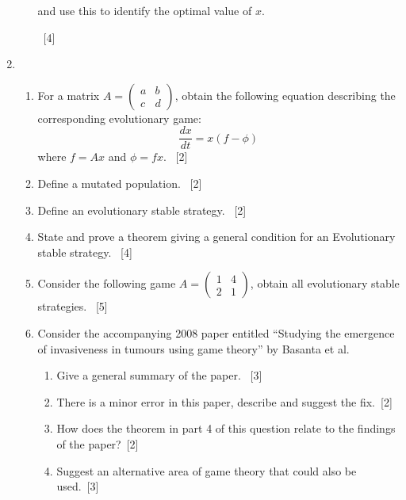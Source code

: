 \documentclass[12pt,a4paper]{article}
\begin{document}
\begin{enumerate}
\begin{enumerate}
            and use this to identify the optimal value of \(x\).

            ~\hfill{[4]}
    \end{enumerate}

\newpage
\item

    \begin{enumerate}
        \item For a matrix \(A=\begin{pmatrix}a&b\\c &d\end{pmatrix}\), obtain
              the following equation describing the corresponding evolutionary
              game:
              \[\frac{dx}{dt}=x(f-\phi)\]
              where \(f=Ax\) and \(\phi=fx\).
              ~\hfill{[2]}
        \item Define a mutated population.
              ~\hfill{[2]}
        \item Define an evolutionary stable strategy.
              ~\hfill{[2]}
        \item State and prove a theorem giving a general condition for an
            Evolutionary stable strategy.
              ~\hfill{[4]}
        \item Consider the following game
        \(A=\begin{pmatrix}1&4\\2 &1\end{pmatrix}\), obtain all evolutionary
            stable strategies.
              ~\hfill{[5]}
         \item Consider the accompanying 2008 paper entitled ``Studying the
             emergence of invasiveness in tumours using game theory'' by Basanta
             et al.
             \begin{enumerate}
                 \item Give a general summary of the paper.
                     ~\hfill{[3]}
                 \item There is a minor error in this paper, describe and
                     suggest the fix.~\hfill{[2]}
                 \item How does the theorem in part 4 of this question relate to
                     the findings of the paper?~\hfill{[2]}
                 \item Suggest an alternative area of game theory that could
                     also be used.~\hfill{[3]}
             \end{enumerate}
    \end{enumerate}


\end{enumerate}
\end{document}
